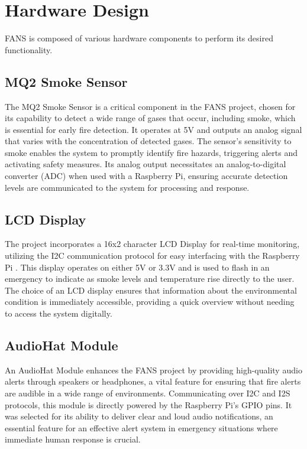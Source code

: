 \section{Hardware Design}


FANS is composed of various hardware components to perform its desired functionality.

\subsection{MQ2 Smoke Sensor}

The MQ2 Smoke Sensor is a critical component in the FANS project, chosen for its capability to detect a wide range of
gases that occur, including smoke, which is essential for early fire detection. It operates at 5V and outputs an analog
signal that varies with the concentration of detected gases. The sensor's sensitivity to smoke enables the system to
promptly identify fire hazards, triggering alerts and activating safety measures. Its analog output necessitates an
analog-to-digital converter (ADC) when used with a Raspberry Pi, ensuring accurate detection levels are communicated to
the system for processing and response.

\subsection{LCD Display}

The project incorporates a 16x2 character LCD Display for real-time monitoring, utilizing the I2C communication
protocol for easy interfacing with the Raspberry Pi . This display operates on either 5V or 3.3V and is used to flash
in an emergency to indicate as smoke levels and temperature rise directly to the user. The choice of an LCD display
ensures that information about the environmental condition is immediately accessible, providing a quick overview
without needing to access the system digitally.

\subsection{AudioHat Module}


An AudioHat Module enhances the FANS project by providing high-quality audio alerts through speakers or headphones, a
vital feature for ensuring that fire alerts are audible in a wide range of environments. Communicating over I2C and I2S
protocols, this module is directly powered by the Raspberry Pi's GPIO pins. It was selected for its ability to deliver
clear and loud audio notifications, an essential feature for an effective alert system in emergency situations where
immediate human response is crucial.

